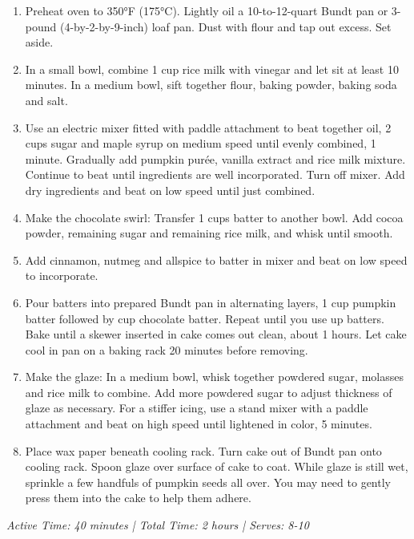 \documentclass[12pt]{article}
\begin{document}
\begin{enumerate}
    \item Preheat oven to 350°F (175°C). Lightly oil a 10-to-12-quart Bundt pan or 3-pound (4-by-2-by-9-inch) loaf pan. Dust with flour and tap out excess. Set aside.
    
    \item In a small bowl, combine 1 cup rice milk with vinegar and let sit at least 10 minutes. In a medium bowl, sift together flour, baking powder, baking soda and salt.
    
    \item Use an electric mixer fitted with paddle attachment to beat together oil, 2 cups sugar and maple syrup on medium speed until evenly combined, 1 minute. Gradually add pumpkin purée, vanilla extract and rice milk mixture. Continue to beat until ingredients are well incorporated. Turn off mixer. Add dry ingredients and beat on low speed until just combined.
    
    \item Make the chocolate swirl: Transfer 1 cups batter to another bowl. Add cocoa powder, remaining sugar and remaining rice milk, and whisk until smooth.
    
    \item Add cinnamon, nutmeg and allspice to batter in mixer and beat on low speed to incorporate.
    
    \item Pour batters into prepared Bundt pan in alternating layers, 1 cup pumpkin batter followed by  cup chocolate batter. Repeat until you use up batters. Bake until a skewer inserted in cake comes out clean, about 1 hours. Let cake cool in pan on a baking rack 20 minutes before removing.
    
    \item Make the glaze: In a medium bowl, whisk together powdered sugar, molasses and rice milk to combine. Add more powdered sugar to adjust thickness of glaze as necessary. For a stiffer icing, use a stand mixer with a paddle attachment and beat on high speed until lightened in color, 5 minutes.
    
    \item Place wax paper beneath cooling rack. Turn cake out of Bundt pan onto cooling rack. Spoon glaze over surface of cake to coat. While glaze is still wet, sprinkle a few handfuls of pumpkin seeds all over. You may need to gently press them into the cake to help them adhere.
\end{enumerate}

\textit{Active Time: 40 minutes | Total Time: 2 hours | Serves: 8-10}
\end{document}
